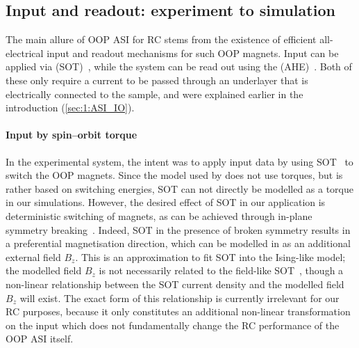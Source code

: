 \subsection{Input and readout: experiment to simulation} \label{sec:3:IO_exp_to_sim}
The main allure of OOP ASI for RC stems from the existence of efficient all-electrical input and readout mechanisms for such OOP magnets.
Input can be applied via  (SOT)~\cite{SOT_FM_AFM,SOTswitchingCoPt}, while the system can be read out using the  (AHE)~\cite{AHE}.
Both of these only require a current to be passed through an underlayer that is electrically connected to the sample, and were explained earlier in the introduction (\cref{sec:1:ASI_IO}).

\paragraph{Input by spin--orbit torque}
In the experimental system, the intent was to apply input data by using SOT~\cite{SOTswitchingCoPt} to switch the OOP magnets.
Since the model used by \hotspice does not use torques, but is rather based on switching energies, SOT can not directly be modelled as a torque in our simulations.
However, the desired effect of SOT in our application is deterministic switching of magnets, as can be achieved through in-plane symmetry breaking~\cite{SOT_Roadmap}. %
Indeed, SOT in the presence of broken symmetry results in a preferential magnetisation direction, which can be modelled in \hotspice as an additional external field $B_z$.
This is an approximation to fit SOT into the Ising-like model; the modelled field $B_z$ is not necessarily related to the field-like SOT~\cite{SOT_firstprinciplesCoPt}, though a non-linear relationship between the SOT current density and the modelled field $B_z$ will exist.
The exact form of this relationship is currently irrelevant for our RC purposes, because it only constitutes an additional non-linear transformation on the input which does not fundamentally change the RC performance of the OOP ASI itself.

